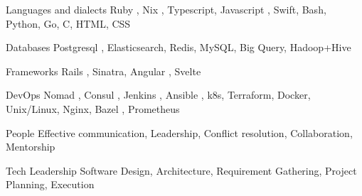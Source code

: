
\begin{cvskills}

  \cvskill
    {Languages and dialects} %
    {Ruby \cvstar, Nix \cvstar, Typescript, Javascript \cvstar, Swift, Bash, Python, Go, C, HTML, CSS} %

  \cvskill
    {Databases} %
    {Postgresql \cvstar, Elasticsearch, Redis, MySQL, Big Query, Hadoop+Hive} %

  \cvskill
    {Frameworks} %
    {Rails \cvstar, Sinatra, Angular \cvstar, Svelte} %

  \cvskill
    {DevOps} %
    {Nomad \cvstar, Consul \cvstar, Jenkins \cvstar, Ansible \cvstar, k8s, Terraform, Docker, Unix/Linux, Nginx, Bazel \cvstar, Prometheus} %

  \cvskill
    {People} %
    {Effective communication, Leadership, Conflict resolution, Collaboration, Mentorship} %


  \cvskill
    {Tech Leadership} %
    {Software Design, Architecture, Requirement Gathering, Project Planning, Execution} %

\end{cvskills}
